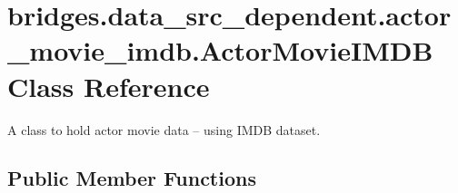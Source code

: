 \hypertarget{classbridges_1_1data__src__dependent_1_1actor__movie__imdb_1_1_actor_movie_i_m_d_b}{}\section{bridges.\+data\+\_\+src\+\_\+dependent.\+actor\+\_\+movie\+\_\+imdb.\+Actor\+Movie\+I\+M\+DB Class Reference}
\label{classbridges_1_1data__src__dependent_1_1actor__movie__imdb_1_1_actor_movie_i_m_d_b}


A class to hold actor movie data -- using I\+M\+DB dataset.  


\subsection*{Public Member Functions}
